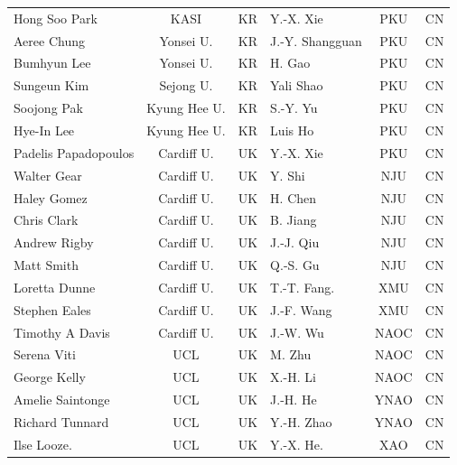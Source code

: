 \documentclass[legal,11pt]{article}
\begin{document}
\begin{table}[htbp]
\begin{threeparttable}[b]
\begin{tabular}{lcclcc}
Hong Soo Park        & KASI              & KR & Y.-X. Xie         & PKU           & CN \\
Aeree Chung          & Yonsei U.         & KR & J.-Y. Shangguan   & PKU           & CN \\
Bumhyun Lee          & Yonsei U.         & KR &  H. Gao           & PKU           & CN \\
Sungeun Kim          & Sejong U.         & KR & Yali Shao         & PKU           & CN \\
Soojong Pak          & Kyung Hee U.      & KR & S.-Y. Yu          & PKU           & CN \\
Hye-In Lee           & Kyung Hee U.      & KR & Luis Ho           & PKU           & CN \\
Padelis Papadopoulos & Cardiff U.        & UK & Y.-X. Xie         & PKU           & CN \\
Walter Gear          & Cardiff U.        & UK & Y. Shi            & NJU           & CN  \\ 
Haley Gomez          & Cardiff U.        & UK & H. Chen           & NJU           & CN \\
Chris Clark          & Cardiff U.        & UK & B. Jiang          & NJU           & CN \\
Andrew Rigby         & Cardiff U.        & UK & J.-J. Qiu         & NJU           & CN  \\
Matt Smith           & Cardiff U.        & UK & Q.-S. Gu          & NJU           & CN \\
Loretta Dunne        & Cardiff U.        & UK & T.-T. Fang.       & XMU           & CN \\
Stephen Eales        & Cardiff U.        & UK & J.-F. Wang        & XMU           & CN \\
Timothy A Davis      & Cardiff U.        & UK & J.-W. Wu          & NAOC          & CN \\ 
Serena Viti          & UCL               & UK & M. Zhu            & NAOC          & CN \\
George Kelly         & UCL               & UK & X.-H. Li          & NAOC          & CN \\
Amelie Saintonge     & UCL               & UK & J.-H. He          & YNAO          & CN \\
Richard Tunnard      & UCL               & UK & Y.-H. Zhao        & YNAO          & CN \\
Ilse Looze.          & UCL               & UK & Y.-X. He.         & XAO           & CN \\

\end{tabular}
\end{threeparttable}
\end{table}
\end{document}
